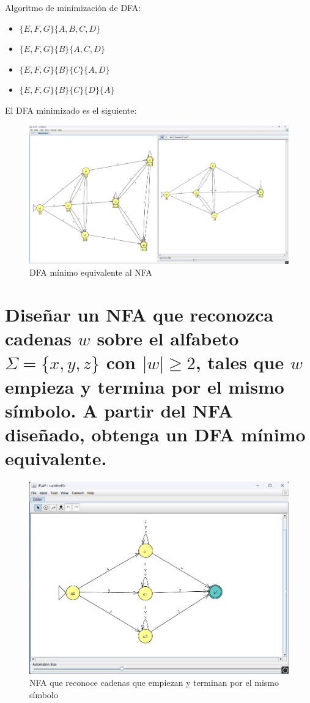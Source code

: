 \documentclass[11pt]{report}
\begin{document}
Algoritmo de minimización de DFA:
\begin{itemize}
  \item $\{E, F, G\} \{A, B, C, D\}$
  \item $\{E, F, G\} \{B\} \{A, C, D\}$
  \item $\{E, F, G\} \{B\} \{C\} \{A, D\}$
  \item $\{E, F, G\} \{B\} \{C\} \{D\} \{A\}$
\end{itemize}

El DFA minimizado es el siguiente:
\begin{figure}[H]
  \centering
  \includegraphics[scale=0.3]{img/DFA_to_DFA_minimized_06.png}
  \caption{DFA mínimo equivalente al NFA}
\end{figure}

\newpage

\section{Diseñar un NFA que reconozca cadenas $w$ sobre el alfabeto $\Sigma = \{x, y, z\}$ con $|w| \geq 2$, tales que $w$ empieza y termina por el mismo símbolo. A partir del NFA diseñado, obtenga un DFA mínimo equivalente.}
\begin{figure}[H]
  \centering
  \includegraphics[scale=0.4]{img/NFA_07.png}
  \caption{NFA que reconoce cadenas que empiezan y terminan por el mismo símbolo}
\end{figure}
\end{document}
